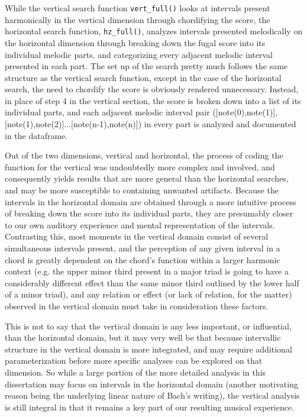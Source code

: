     While the vertical search function \texttt{vert\_full()} looks at
intervals present harmonically in the vertical dimension through
chordifying the score, the horizontal search function,
\texttt{hz\_full()}, analyzes intervals presented melodically on the
horizontal dimension through breaking down the fugal score into its
individual melodic parts, and categorizing every adjacent melodic
interval presented in each part. The set up of the search pretty much
follows the same structure as the vertical search function, except in
the case of the horizontal search, the need to chordify the score is
obviously rendered unnecessary. Instead, in place of step 4 in the
vertical section, the score is broken down into a list of its individual
parts, and each adjacent melodic interval pair ({[}note(0),note(1){]},
{[}note(1),note(2){]}...{[}note(n-1),note(n){]}) in every part is
analyzed and documented in the dataframe.

Out of the two dimensions, vertical and horizontal, the process of
coding the function for the vertical was undoubtedly more complex and
involved, and consequently yields results that are more general than the
horizontal searches, and may be more susceptible to containing unwanted
artifacts. Because the intervals in the horizontal domain are obtained
through a more intuitive process of breaking down the score into its
individual parts, they are presumably closer to our own auditory
experience and mental representation of the intervals. Contrasting this,
most moments in the vertical domain consist of several simultaneous
intervals present, and the perception of any given interval in a chord
is greatly dependent on the chord's function within a larger harmonic
context (e.g. the upper minor third present in a major triad is going to
have a considerably different effect than the same minor third outlined
by the lower half of a minor triad), and any relation or effect (or lack
of relation, for the matter) observed in the vertical domain must take
in consideration these factors.

This is not to say that the vertical domain is any less important, or
influential, than the horizontal domain, but it may very well be that
because intervallic structure in the vertical domain is more integrated,
and may require additional parameterization before more specific
analyses can be explored on that dimension. So while a large portion of
the more detailed analysis in this dissertation may focus on intervals
in the horizontal domain (another motivating reason being the underlying
linear nature of Bach's writing), the vertical analysis is still
integral in that it remains a key part of our resulting musical
experience.

